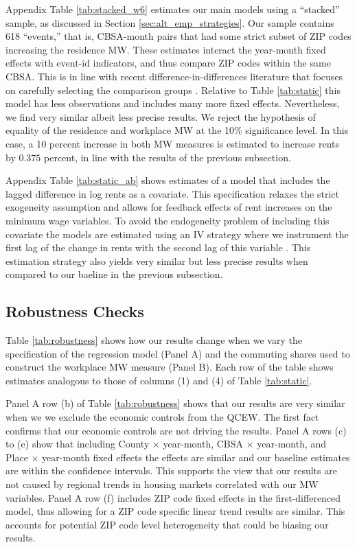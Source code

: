 Appendix Table \ref{tab:stacked_w6} estimates our main models using a 
``stacked'' sample, as discussed in Section \ref{sec:alt_emp_strategies}.
Our sample contains 618 ``events,'' that is, CBSA-month pairs that had some 
strict subset of ZIP codes increasing the residence MW.
These estimates interact the year-month fixed effects with event-id indicators, 
and thus compare ZIP codes within the same CBSA.
This is in line with recent difference-in-differences literature that 
focuses on carefully selecting the comparison groups 
\parencite{CallawayEtAl2021, deChaisemartinEtAl2022, RothEtAl2022}.
Relative to Table \ref{tab:static} this model has less observations and includes 
many more fixed effects.
Nevertheless, we find very similar albeit less precise results.
We reject the hypothesis of equality of the residence and workplace MW at the
10\% significance level.
In this case, a 10 percent increase in both MW measures is estimated to 
increase rents by $0.375$ percent, in line with the results of the previous 
subsection.

Appendix Table \ref{tab:static_ab} shows estimates of a model that includes
the lagged difference in log rents as a covariate.
This specification relaxes the strict exogeneity assumption and allows for 
feedback effects of rent increases on the minimum wage variables.
To avoid the endogeneity problem of including this covariate the models are 
estimated using an IV strategy where we instrument the first lag of the change 
in rents with the second lag of this variable 
\parencite{ArellanoBond1991,ArellanoHonore2001}.
This estimation strategy also yields very similar but less precise results
when compared to our baeline in the previous subsection.

\subsection{Robustness Checks}

Table \ref{tab:robustness} shows how our results change when we vary the
specification of the regression model (Panel A) and the commuting shares used 
to construct the workplace MW measure (Panel B).
Each row of the table shows estimates analogous to those of columns (1) and (4)
of Table \ref{tab:static}.

Panel A row (b) of Table \ref{tab:robustness} shows that our results are very similar 
when we we exclude the economic controls from the QCEW. 
The first fact confirms that our economic controls are not driving the results.
Panel A rows (c) to (e) show that including County $\times$ year-month, 
CBSA $\times$ year-month, and Place $\times$ year-month fixed effects
the effects are similar and our baseline estimates are within the confidence 
intervals. This supports the view that our results are not caused by regional 
trends in housing markets correlated with our MW variables.
Panel A row (f) includes ZIP code fixed effects in the first-differenced model,
thus allowing for a ZIP code specific linear trend results are similar. This 
accounts for potential ZIP code level heterogeneity that could be biasing our results.


